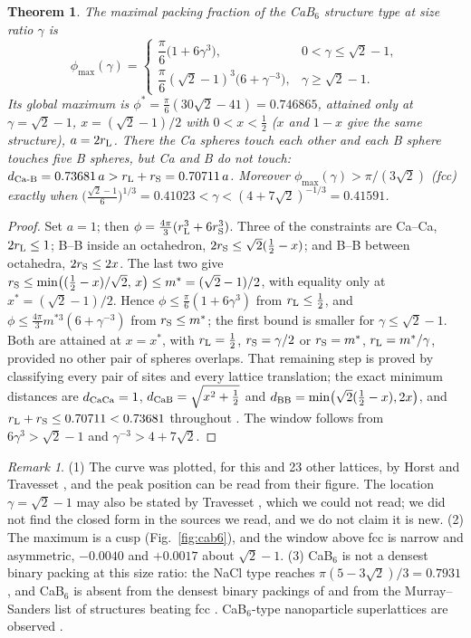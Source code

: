 \documentclass[11pt]{amsart}
\newtheorem{theorem}{Theorem}
\theoremstyle{definition}
\theoremstyle{remark}
\newtheorem{remark}{Remark}
\begin{document}
\begin{theorem}\label{thm:cab6}
The maximal packing fraction of the CaB$_6$ structure type at size ratio $\gamma$ is
\[
\phi_{\max}(\gamma)=\begin{cases}\dfrac{\pi}{6}\bigl(1+6\gamma^3\bigr), & 0<\gamma\le\sqrt2-1,\\[2mm]
\dfrac{\pi}{6}(\sqrt2-1)^3\bigl(6+\gamma^{-3}\bigr), & \gamma\ge\sqrt2-1.\end{cases}
\]
Its global maximum is $\phi^*=\frac{\pi}{6}(30\sqrt2-41)=0.746865$, attained only at $\gamma=\sqrt2-1$, $x=(\sqrt2-1)/2$ with $0<x<\tfrac12$ ($x$ and $1-x$ give the same structure), $a=2r_{\rm L}$. There the Ca spheres touch each other and each B sphere touches five B spheres, but Ca and B do not touch: $d_{\rm Ca\text{-}B}=0.73681\,a>r_{\rm L}+r_{\rm S}=0.70711\,a$. Moreover $\phi_{\max}(\gamma)>\pi/(3\sqrt2)$ (fcc) exactly when $\bigl(\tfrac{\sqrt2-1}{6}\bigr)^{1/3}=0.41023<\gamma<(4+7\sqrt2)^{-1/3}=0.41591$.
\end{theorem}

\begin{proof}
Set $a=1$; then $\phi=\frac{4\pi}{3}(r_{\rm L}^3+6r_{\rm S}^3)$. Three of the constraints are Ca--Ca, $2r_{\rm L}\le1$; B--B inside an octahedron, $2r_{\rm S}\le\sqrt2(\tfrac12-x)$; and B--B between octahedra, $2r_{\rm S}\le2x$. The last two give $r_{\rm S}\le\min\bigl((\tfrac12-x)/\sqrt2,\,x\bigr)\le m^*=(\sqrt2-1)/2$, with equality only at $x^*=(\sqrt2-1)/2$. Hence $\phi\le\frac{\pi}{6}(1+6\gamma^3)$ from $r_{\rm L}\le\frac12$, and $\phi\le\frac{4\pi}{3}m^{*3}(6+\gamma^{-3})$ from $r_{\rm S}\le m^*$; the first bound is smaller for $\gamma\le\sqrt2-1$. Both are attained at $x=x^*$, with $r_{\rm L}=\frac12$, $r_{\rm S}=\gamma/2$ or $r_{\rm S}=m^*$, $r_{\rm L}=m^*/\gamma$, provided no other pair of spheres overlaps. That remaining step is proved by classifying every pair of sites and every lattice translation; the exact minimum distances are $d_{\rm CaCa}=1$, $d_{\rm CaB}=\sqrt{x^2+\tfrac12}$ and $d_{\rm BB}=\min\bigl(\sqrt2(\tfrac12-x),2x\bigr)$, and $r_{\rm L}+r_{\rm S}\le0.70711<0.73681$ throughout \cite{RepoCab6}. The window follows from $6\gamma^3>\sqrt2-1$ and $\gamma^{-3}>4+7\sqrt2$.
\end{proof}

\begin{remark}
(1) The curve was plotted, for this and 23 other lattices, by Horst and Travesset \cite[Fig.~3]{HorstTravesset2016}, and the peak position can be read from their figure. The location $\gamma=\sqrt2-1$ may also be stated by Travesset \cite{Travesset2017}, which we could not read; we did not find the closed form in the sources we read, and we do not claim it is new. (2) The maximum is a cusp (Fig.~\ref{fig:cab6}), and the window above fcc is narrow and asymmetric, $-0.0040$ and $+0.0017$ about $\sqrt2-1$. (3) CaB$_6$ is not a densest binary packing at this size ratio: the NaCl type reaches $\pi(5-3\sqrt2)/3=0.7931$, and CaB$_6$ is absent from the densest binary packings of \cite{Hopkins2012} and from the Murray--Sanders list of structures beating fcc \cite{MurraySanders1980}. CaB$_6$-type nanoparticle superlattices are observed \cite{Shevchenko2006}.
\end{remark}
\end{document}
